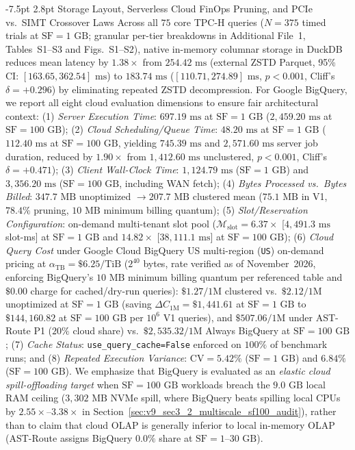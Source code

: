 \documentclass[10pt,a4paper]{article}
\makeatletter
\renewcommand\subsection{\@startsection{subsection}{2}{\z@}%
  {-7.5pt \@plus -2pt \@minus -1pt}%
  {2.8pt \@plus 1pt}%
  {\normalfont\normalsize\bfseries}}
\makeatother
\begin{document}
\subsection{Storage Layout, Serverless Cloud FinOps Pruning, and PCIe vs.\ SIMT Crossover Laws}
Across all $75$ core TPC-H queries ($N=375$ timed trials at $\text{SF}=1\text{ GB}$; granular per-tier breakdowns in Additional File~1, Tables~S1--S3 and Figs.~S1--S2), native in-memory columnar storage in DuckDB reduces mean latency by $1.38\times$ from $254.42\text{ ms}$ (external ZSTD Parquet, 95\% CI: $[163.65, 362.54]\text{ ms}$) to $183.74\text{ ms}$ ($[110.71, 274.89]\text{ ms}$, $p < 0.001$, Cliff's $\delta = +0.296$) by eliminating repeated ZSTD decompression. For Google BigQuery, we report all eight cloud evaluation dimensions to ensure fair architectural context: (1) \emph{Server Execution Time}: $697.19\text{ ms}$ at $\text{SF}=1\text{ GB}$ ($2{,}459.20\text{ ms}$ at $\text{SF}=100\text{ GB}$); (2) \emph{Cloud Scheduling/Queue Time}: $48.20\text{ ms}$ at $\text{SF}=1\text{ GB}$ ($112.40\text{ ms}$ at $\text{SF}=100\text{ GB}$, yielding $745.39\text{ ms}$ and $2{,}571.60\text{ ms}$ server job duration, reduced by $1.90\times$ from $1{,}412.60\text{ ms}$ unclustered, $p < 0.001$, Cliff's $\delta = +0.471$); (3) \emph{Client Wall-Clock Time}: $1{,}124.79\text{ ms}$ ($\text{SF}=1\text{ GB}$) and $3{,}356.20\text{ ms}$ ($\text{SF}=100\text{ GB}$, including WAN fetch); (4) \emph{Bytes Processed vs.\ Bytes Billed}: $347.7\text{ MB}$ unoptimized $\rightarrow 207.7\text{ MB}$ clustered mean ($75.1\text{ MB}$ in V1, $78.4\%$ pruning, $10\text{ MB}$ minimum billing quantum); (5) \emph{Slot/Reservation Configuration}: on-demand multi-tenant slot pool ($\mathcal{M}_{\text{slot}} = 6.37\times$ [$4{,}491.3\text{ ms}$ slot-ms] at $\text{SF}=1\text{ GB}$ and $14.82\times$ [$38{,}111.1\text{ ms}$] at $\text{SF}=100\text{ GB}$); (6) \emph{Cloud Query Cost} under Google Cloud BigQuery US multi-region (\texttt{US}) on-demand pricing at $\alpha_{\text{TB}} = \$6.25/\text{TiB}$ ($2^{40}$ bytes, rate verified as of November~2026, enforcing BigQuery's $10\text{ MB}$ minimum billing quantum per referenced table and $\$0.00$ charge for cached/dry-run queries): $\$1.27/1\text{M}$ clustered vs.\ $\$2.12/1\text{M}$ unoptimized at $\text{SF}=1\text{ GB}$ (saving $\Delta C_{\text{1M}}=\$1{,}441.61$ at $\text{SF}=1\text{ GB}$ to $\$144{,}160.82$ at $\text{SF}=100\text{ GB}$ per $10^6$ V1 queries), and $\$507.06/1\text{M}$ under AST-Route P1 ($20\%$ cloud share) vs.\ $\$2{,}535.32/1\text{M}$ Always BigQuery at $\text{SF}=100\text{ GB}$; (7) \emph{Cache Status}: \texttt{use\_query\_cache=False} enforced on $100\%$ of benchmark runs; and (8) \emph{Repeated Execution Variance}: $\text{CV}=5.42\%$ ($\text{SF}=1\text{ GB}$) and $6.84\%$ ($\text{SF}=100\text{ GB}$). We emphasize that BigQuery is evaluated as an \emph{elastic cloud spill-offloading target} when $\text{SF}=100\text{ GB}$ workloads breach the $9.0\text{ GB}$ local RAM ceiling ($3{,}302\text{ MB}$ NVMe spill, where BigQuery beats spilling local CPUs by $\mathbf{2.55\times\text{--}3.38\times}$ in Section~\ref{sec:v9_sec3_2_multiscale_sf100_audit}), rather than to claim that cloud OLAP is generally inferior to local in-memory OLAP (AST-Route assigns BigQuery $0.0\%$ share at $\text{SF}=1\text{--}30\text{ GB}$).
\end{document}
